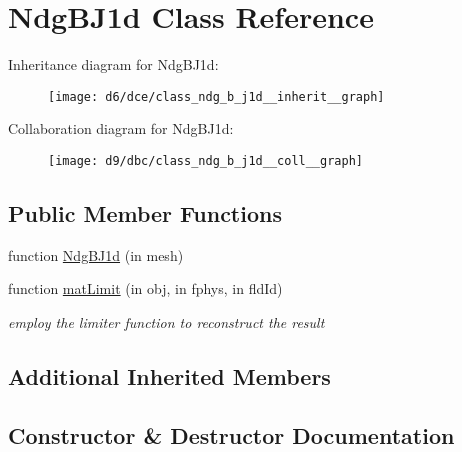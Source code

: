 \hypertarget{class_ndg_b_j1d}{}\section{Ndg\+B\+J1d Class Reference}
\label{class_ndg_b_j1d}


Inheritance diagram for Ndg\+B\+J1d\+:
\nopagebreak
\begin{figure}[H]
\begin{center}
\leavevmode
\texttt{[image: d6/dce/class\_ndg\_b\_j1d\_\_inherit\_\_graph]}
\end{center}
\end{figure}


Collaboration diagram for Ndg\+B\+J1d\+:
\nopagebreak
\begin{figure}[H]
\begin{center}
\leavevmode
\texttt{[image: d9/dbc/class\_ndg\_b\_j1d\_\_coll\_\_graph]}
\end{center}
\end{figure}
\subsection*{Public Member Functions}
\begin{DoxyCompactItemize}
\item 
function \hyperlink{class_ndg_b_j1d_a1a6e6d929ab3e571f56a1e77d06e923a}{Ndg\+B\+J1d} (in mesh)
\item 
function \hyperlink{class_ndg_b_j1d_a913e385cd4c535f6dd7fcfbb7594e421}{mat\+Limit} (in obj, in fphys, in fld\+Id)
\begin{DoxyCompactList}\small\item\em employ the limiter function to reconstruct the result \end{DoxyCompactList}\end{DoxyCompactItemize}
\subsection*{Additional Inherited Members}


\subsection{Constructor \& Destructor Documentation}
\mbox{\label{class_ndg_b_j1d_a1a6e6d929ab3e571f56a1e77d06e923a}} 
